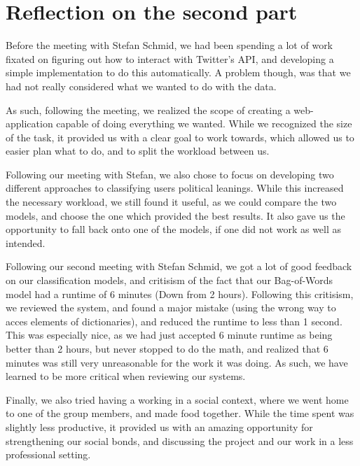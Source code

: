 \section{Reflection on the second part}
Before the meeting with Stefan Schmid, we had been spending a lot of work
fixated on figuring out how to interact with Twitter's API, and developing a simple
implementation to do this automatically. A problem though, was that we had not
really considered what we wanted to do with the data.\nl

As such, following the meeting, we realized the scope of creating a
web-application capable of doing everything we wanted. While we recognized the
size of the task, it provided us with a clear goal to work towards, which
allowed us to easier plan what to do, and to split the workload between us.\nl  

Following our meeting with Stefan, we also chose to focus on developing two
different approaches to classifying users political leanings. While this
increased the necessary workload, we still found it useful, as we could compare
the two models, and choose the one which provided the best results. It also
gave us the opportunity to fall back onto one of the models, if one did not work
as well as intended.\nl

Following our second meeting with Stefan Schmid, we got a lot of good feedback
on our classification models, and critisism of the fact that our Bag-of-Words
model had a runtime of 6 minutes (Down from 2 hours). Following this critisism,
we reviewed the system, and found a major mistake (using the wrong way to acces
elements of dictionaries), and reduced the runtime to less than 1 second. This
was especially nice, as we had just accepted 6 minute runtime as being better
than 2 hours, but never stopped to do the math, and realized that 6 minutes was
still very unreasonable for the work it was doing. As such, we have learned to
be more critical when reviewing our systems.\nl

Finally, we also tried having a working in a social context, where we went home
to one of the group members, and made food together. While the time spent was
slightly less productive, it provided us with an amazing opportunity for
strengthening our social bonds, and discussing the project and our work in a
less professional setting.